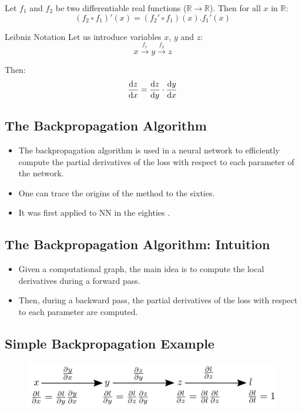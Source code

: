 \documentclass{book}
\newcommand{\R}{\mathbb{R}}
\begin{document}
\begin{block}{}
Let $f_1$ and $f_2$ be two differentiable real functions ($\R \rightarrow \R$). Then for all $x$ in $\R$:
\[
(f_2 \circ f_1)'(x) = (f_2'\circ f_1)(x).f_1'(x)
\]
\end{block}

\begin{block}{Leibniz Notation}
Let us introduce variables $x$, $y$ and $z$:
\[x \xrightarrow{f_1} y \xrightarrow{f_2} z\]

Then:
\[\dv{z}{x} = \dv{z}{y} \cdot \dv{y}{x} \]
\end{block}

\subsection{The Backpropagation Algorithm}

\begin{itemize}
\item The backpropagation algorithm is used in a neural network to efficiently compute the partial derivatives of the loss with respect to each parameter of the network.
\item One can trace the origins of the method to the sixties.
\item It was first applied to NN in the eighties \cite{werbos_applications_1982, lecun_procedure_1985}.
\end{itemize}

\subsection{The Backpropagation Algorithm: Intuition}

\begin{itemize}
\item Given a computational graph, the main idea is to compute the local derivatives during a forward pass.
\item Then, during a backward pass, the partial derivatives of the loss with respect to each parameter are computed.
\end{itemize}

\subsection{Simple Backpropagation Example}

\begin{figure}[h]
    \centering
    \includegraphics[width=\textwidth]{bp_simple.png}
\end{figure}
\end{document}
